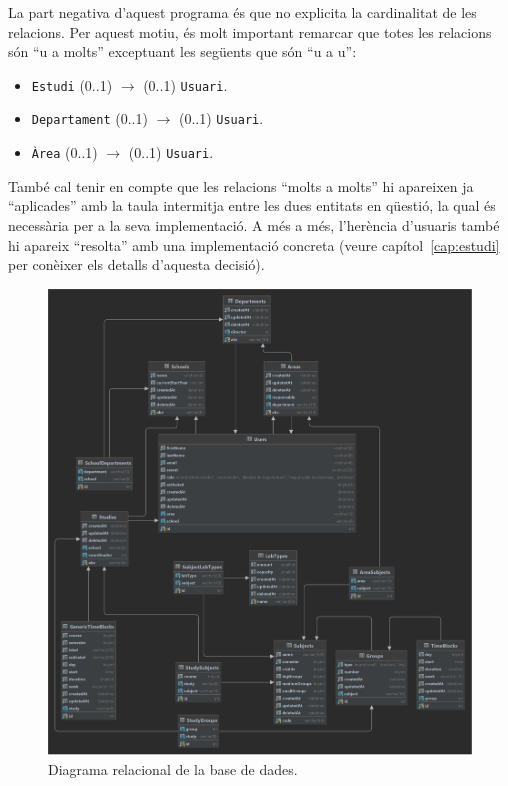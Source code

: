 \documentclass[a4paper,12pt]{ThesisStyle}
\begin{document}
La part negativa d'aquest programa és que no explicita la cardinalitat de les relacions. Per aquest motiu, és molt important remarcar que totes les relacions són ``u a molts'' exceptuant les següents que són ``u a u'':
\begin{itemize}
  \item \texttt{Estudi} (0..1) $\longrightarrow$ (0..1) \texttt{Usuari}.
  \item \texttt{Departament} (0..1) $\longrightarrow$ (0..1) \texttt{Usuari}.
  \item \texttt{Àrea} (0..1) $\longrightarrow$ (0..1) \texttt{Usuari}.
\end{itemize}

També cal tenir en compte que les relacions ``molts a molts'' hi apareixen ja ``aplicades'' amb la taula intermitja entre les dues entitats en qüestió, la qual és necessària per a la seva implementació. A més a més, l'herència d'usuaris també hi apareix ``resolta'' amb una implementació concreta (veure capítol~\ref{cap:estudi} per conèixer els detalls d'aquesta decisió).

\newpage

\begin{figure}[H]
	\centering
	\includegraphics[width=\textwidth]{assets/db.pdf}
	\caption{\label{img:db}Diagrama relacional de la base de dades.}
\end{figure}
\end{document}
